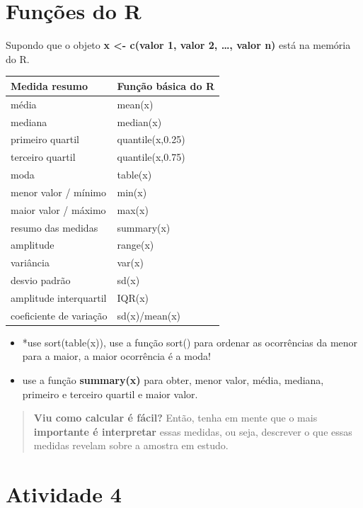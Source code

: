 \documentclass[
]{book}
\begin{document}
\section{Funções do R}\label{funuxe7uxf5es-do-r}

Supondo que o objeto \textbf{x \textless- c(valor 1, valor 2, \ldots, valor n)} está na memória do R.

\begin{longtable}[]{@{}ll@{}}
\toprule\noalign{}
Medida resumo & Função básica do R \\
\midrule\noalign{}
\endhead
\bottomrule\noalign{}
\endlastfoot
média & mean(x) \\
mediana & median(x) \\
primeiro quartil & quantile(x,0.25) \\
terceiro quartil & quantile(x,0.75) \\
moda & table(x) \\
menor valor / mínimo & min(x) \\
maior valor / máximo & max(x) \\
resumo das medidas & summary(x) \\
amplitude & range(x) \\
variância & var(x) \\
desvio padrão & sd(x) \\
amplitude interquartil & IQR(x) \\
coeficiente de variação & sd(x)/mean(x) \\
\end{longtable}

\begin{itemize}
\item
  *use sort(table(x)), use a função sort() para ordenar as ocorrências da menor para a maior, a maior ocorrência é a moda!
\item
  use a função \textbf{summary(x)} para obter, menor valor, média, mediana, primeiro e terceiro quartil e maior valor.
\end{itemize}

\begin{quote}
\textbf{Viu como calcular é fácil?} Então, tenha em mente que o mais \textbf{importante é interpretar} essas medidas, ou seja, descrever o que essas medidas revelam sobre a amostra em estudo.
\end{quote}

\section{Atividade 4}\label{atividade-4}
\end{document}
